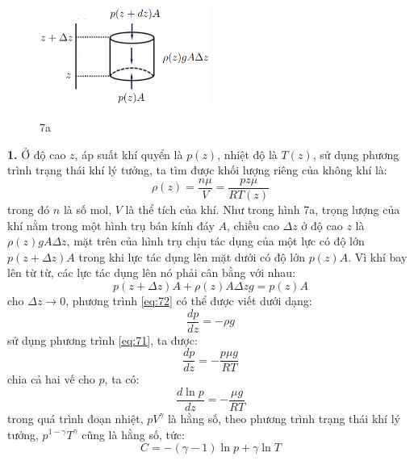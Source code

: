 \begin{figure}
  \centering
  \includegraphics[width=0.5\textwidth]{images/Hinh 7a (S).png}
  \begin{center}
    \figurename{ 7a}
  \end{center}
\end{figure}

\noindent\textbf{1.} Ở độ cao $z$, áp suất khí quyển là $p(z)$, nhiệt độ là $T(z)$, sử dụng phương trình trạng thái khí lý tưởng, ta tìm được khối lượng riêng của không khí là:
\begin{equation}
  \label{eq:71}
  \rho(z)=\frac{n\mu}{V}=\frac{p{z}\mu}{RT(z)}
\end{equation}
trong đó $n$ là số mol, $V$ là thể tích của khí. Như trong hình 7a, trọng lượng của khí nằm trong một hình trụ bán kính đáy $A$, chiều cao $\Delta z$ ở độ cao $z$ là $\rho(z)gA\Delta z$, mặt trên của hình trụ chịu tác dụng của một lực có độ lớn $p(z+\Delta z)A$ trong khi lực tác dụng lên mặt dưới có độ lớn $p(z)A$. Vì khí bay lên từ từ, các lực tác dụng lên nó phải cân bằng với nhau:
\begin{equation}
  \label{eq:72}
  p(z+\Delta z)A+\rho(z)A\Delta zg=p(z)A
\end{equation}
cho $\Delta z\to 0$, phương trình \eqref{eq:72} có thể được viết dưới dạng:
\begin{equation}
  \label{eq:73}
  \frac{dp}{dz}=-\rho g
\end{equation}
sử dụng phương trình \eqref{eq:71}, ta được:
\begin{equation}
  \label{eq:74}
  \frac{dp}{dz}=-\frac{p\mu g}{RT}
\end{equation}
chia cả hai vế cho $p$, ta có:
\begin{equation}
  \label{eq:75}
  \frac{d\ln p}{dz}=-\frac{\mu g}{RT}
\end{equation}
trong quá trình đoạn nhiệt, $pV^{\gamma}$ là hằng số, theo phương trình trạng thái khí lý tưởng, $p^{1-\gamma}T^{\gamma}$ cũng là hằng số, tức:
\begin{equation}
  \label{eq:76}
  C=-(\gamma -1)\ln{p}+\gamma\ln{T}
\end{equation}
